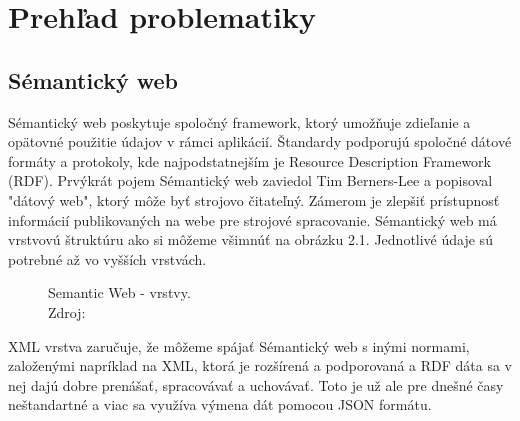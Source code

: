 \documentclass[12pt, a4paper, oneside]{book}
\begin{document}

\part{Prehľad problematiky}
\chapter{Sémantický web}
Sémantický web \cite{semantic} poskytuje spoločný framework, ktorý umožňuje zdieľanie a opätovné použitie údajov v rámci aplikácií. Štandardy podporujú spoločné dátové formáty a protokoly, kde najpodstatnejším je Resource Description Framework (RDF). Prvýkrát pojem Sémantický web zaviedol Tim Berners-Lee a popisoval "dátový web", ktorý môže byť strojovo čitateľný. Zámerom je zlepšiť prístupnosť informácií publikovaných na webe pre strojové spracovanie. Sémantický web má vrstvovú štruktúru ako si môžeme všimnúť na obrázku 2.1. Jednotlivé údaje sú potrebné až vo vyšších vrstvách. 

\begin{figure}
\label{fig:semantic_web}
\caption{Semantic Web - vrstvy.\\Zdroj: \cite{semanticweb}}

\end{figure}

XML vrstva zaručuje, že môžeme spájať Sémantický web s inými normami, založenými napríklad na XML, ktorá je rozšírená a podporovaná a RDF dáta sa v nej dajú dobre prenášať, spracovávať a uchovávať. Toto je už ale pre dnešné časy neštandartné a viac sa využíva výmena dát pomocou JSON formátu. 
\end{document}
